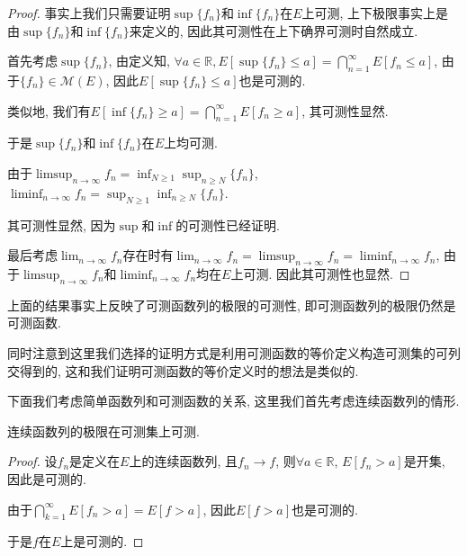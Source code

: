 \documentclass[theorem=false,mathfont=none,openany,sub3section]{easybook}
\begin{document}
\begin{proof}
  事实上我们只需要证明$\sup \{f_n\}$和$\inf \{f_n\}$在$E$上可测, 上下极限事实上是由$\sup \{f_n\}$和$\inf \{f_n\}$来定义的, 因此其可测性在上下确界可测时自然成立.\par
  首先考虑$\sup \{f_n\}$, 由定义知, $\forall a \in \mathbb{R}, E[\sup \{f_n\}\leqslant a]=\bigcap_{n=1}^{\infty}E[f_n\leqslant a]$, 由于$\{f_n\}\in \mathcal{M}(E)$, 因此$E[\sup \{f_n\}\leqslant a]$也是可测的.\par
  类似地, 我们有$E[\inf \{f_n\}\geqslant a]=\bigcap_{n=1}^{\infty}E[f_n\geqslant a]$, 其可测性显然.\par
  于是$\sup \{f_n\}$和$\inf \{f_n\}$在$E$上均可测.\par
  由于$\limsup_{n \to \infty} f_n = \inf_{N\geqslant 1} \sup_{n\geqslant N} \{f_n\}$, $\liminf_{n \to \infty} f_n = \sup_{N\geqslant 1} \inf_{n\geqslant N} \{f_n\}$.\par
  其可测性显然, 因为$\sup$和$\inf$的可测性已经证明.\par
  最后考虑$\lim_{n \to \infty} f_n$存在时有$\lim_{n \to \infty} f_n = \limsup_{n \to \infty} f_n = \liminf_{n \to \infty} f_n$, 由于$\limsup_{n \to \infty} f_n$和$\liminf_{n \to \infty} f_n$均在$E$上可测. 因此其可测性也显然.\par
\end{proof}

\begin{remark}
  上面的结果事实上反映了可测函数列的极限的可测性, 即可测函数列的极限仍然是可测函数.\par
  同时注意到这里我们选择的证明方式是利用可测函数的等价定义构造可测集的可列交得到的, 这和我们证明可测函数的等价定义时的想法是类似的.\par
\end{remark}

下面我们考虑简单函数列和可测函数的关系, 这里我们首先考虑连续函数列的情形.\par

\begin{lemma}
  连续函数列的极限在可测集上可测.\par
\end{lemma}

\begin{proof}
  设$f_n$是定义在$E$上的连续函数列, 且$f_n\to f$, 则$\forall a\in \mathbb{R}$, $E[f_n>a]$是开集, 因此是可测的.\par
  由于$\bigcap_{k=1}^{\infty}E[f_n> a]=E[f>a]$, 因此$E[f>a]$也是可测的.\par
  于是$f$在$E$上是可测的.\par
\end{proof}
\end{document}
